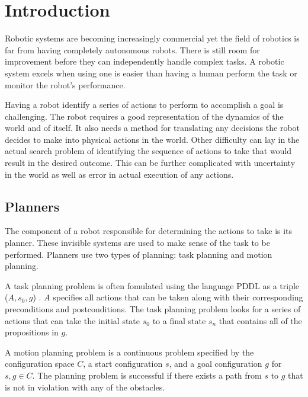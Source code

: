 \chapter{Introduction} \label{intro}
Robotic systems are becoming increasingly commercial yet the field of robotics is far from having completely autonomous robots. There is still room for improvement before they can independently handle complex tasks. A robotic system excels when using one is easier than having a human perform the task or monitor the robot's performance.

Having a robot identify a series of actions to perform to accomplish a goal is challenging. The robot requires a good representation of the dynamics of the world and of itself. It also needs a method for translating any decisions the robot decides to make into physical actions in the world. Other difficulty can lay in the actual search problem of identifying the sequence of actions to take that would result in the desired outcome. This can be further complicated with uncertainty in the world as well as error in actual execution of any actions.

\section{Planners} \label{intro:planners}
The component of a robot responsible for determining the actions to take is its planner. These invisible systems are used to make sense of the task to be performed. Planners use two types of planning: task planning and motion planning. 

A task planning problem is often fomulated using the language PDDL as a triple ($A, s_0, g$) \cite{srivastava:interface}. $A$ specifies all actions that can be taken along with their corresponding preconditions and postconditions. The task planning problem looks for a series of actions that can take the initial state $s_0$ to a final state $s_{n}$ that contains all of the propositions in $g$.

A motion planning problem is a continuous problem specified by the configuration space $C$, a start configuration $s$, and a goal configuration $g$ for $s,g \in C$. The planning problem is successful if there exists a path from $s$ to $g$ that is not in violation with any of the obstacles.

